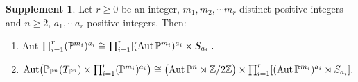 \documentclass[12pt,reqno]{amsart}
\theoremstyle{definition}
\newtheorem{supplement}[lemma]{Supplement}
\numberwithin{equation}{section}
\begin{document}
\begin{supplement}
\label{supp}
Let $ r \geq 0$ be an integer,  $ m_{1}, m_{2}, \cdots m_{r}$ distinct positive integers and $ n\geq 2$, $ a_{1},\cdots a_{r}$ positive integers. Then: 
\begin{enumerate}
\item  \textnormal{Aut} $\prod_{i=1}^r(\mathbb{P}^{m_{i}})^{a_{i}} \cong \prod_{i=1}^{r} 
[(\textnormal{Aut}\,\mathbb{P}^{m_{i}})^{a_{i}} \rtimes S_{a_{i}}].$ 
\vspace{2pt}
\item $\textnormal{Aut}\big(\mathbb{P}_{\mathbb{P}^n}(T_{\mathbb{P}^n}) \times \prod_{i=1}^{r}(\mathbb{P}^{m_{i}})^{a_{i}}\big) \cong \big(\textnormal{Aut} \,\mathbb{P}^n \rtimes \mathbb{Z}/2 \mathbb{Z} \big)\times \prod_{i=1}^{r} [(\textnormal{Aut}\,\mathbb{P}^{m_{i}})^{a_{i}} \rtimes S_{a_{i}}].$
\end{enumerate}
\end{supplement}
\end{document}
